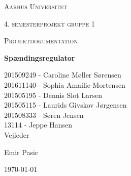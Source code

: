 \thispagestyle{empty}
{\centering
	{\scshape\LARGE Aarhus Universitet \par}
	\vspace{1cm}
	{\scshape\Large 4. semesterprojekt gruppe 1\par}
	{\scshape\Large Projektdokumentation\par}
	\vspace{1.5cm}
	{\huge\bfseries Spændingsregulator\par}
	\vspace{2cm}
	{\Large
		201509249 - Caroline Møller Sørensen\\
		201611140 - Sophia Amailie Mortensen\\
		201505195 - Dennis Slot Larsen \\
		201505115 - Laurids Givskov Jørgensen\\
		201508333 - Søren Jensen\\
		13114 - Jeppe Hansen\\  }
	\vfill
	Vejleder\par
	Emir Pasic
	
	\vfill
	
	{\large \today\par}
	\par}



